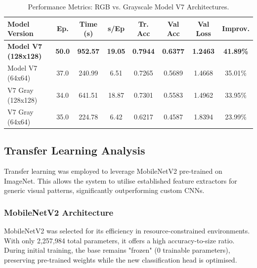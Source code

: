 \documentclass[a4paper,11pt]{article}
\begin{document}
\begin{table}[htbp]
\centering
\small 
\setlength{\tabcolsep}{3pt} 
\caption{Performance Metrics: RGB vs. Grayscale Model V7 Architectures.}
\label{tab:model_performance_grayscaled}
\begin{tabular}{|l|c|c|c|c|c|c|c|}
\hline
\textbf{Model Version} & \textbf{Ep.} & \textbf{Time (s)} & \textbf{s/Ep} & \textbf{Tr. Acc} & \textbf{Val Acc} & \textbf{Val Loss} & \textbf{Improv.} \\ \hline
\textbf{Model V7 (128x128)} & \textbf{50.0} & \textbf{952.57} & \textbf{19.05} & \textbf{0.7944} & \textbf{0.6377} & \textbf{1.2463} & \textbf{41.89\%} \\ \hline
Model V7 (64x64)       & 37.0 & 240.99 & 6.51  & 0.7265 & 0.5689 & 1.4668 & 35.01\% \\ \hline
V7 Gray (128x128)      & 34.0 & 641.51 & 18.87 & 0.7301 & 0.5583 & 1.4962 & 33.95\% \\ \hline
V7 Gray (64x64)        & 35.0 & 224.78 & 6.42  & 0.6217 & 0.4587 & 1.8394 & 23.99\% \\ \hline
\end{tabular}
\end{table}

\subsection{Transfer Learning Analysis}
Transfer learning was employed to leverage MobileNetV2 pre-trained on ImageNet. This allows the system to utilise established feature extractors for generic visual patterns, significantly outperforming custom CNNs.

\subsubsection{MobileNetV2 Architecture}
MobileNetV2 was selected for its efficiency in resource-constrained environments. With only 2,257,984 total parameters, it offers a high accuracy-to-size ratio. During initial training, the base remains "frozen" (0 trainable parameters), preserving pre-trained weights while the new classification head is optimised.
\end{document}
